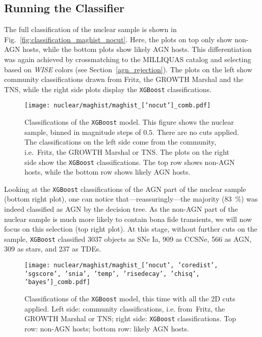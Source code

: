 \subsection{Running the Classifier}\label{classifier_res}
The full classification of the nuclear sample is shown in Fig.~\ref{fig:classification_maghist_nocut}. Here, the plots on top only show non-AGN hosts, while the bottom plots show likely AGN hosts. This differentiation was again achieved by crossmatching to the MILLIQUAS catalog and selecting based on \textit{WISE} colors (see Section~\ref{agn_rejection}). The plots on the left show community classifications drawn from Fritz, the GROWTH Marshal and the TNS, while the right side plots display the \texttt{XGBoost} classifications.

\begin{figure}[H]
  \texttt{[image: nuclear/maghist/maghist\_['nocut']\_comb.pdf]}
  \caption[Classification without cuts]{Classifications of the \texttt{XGBoost} model. This figure shows the nuclear sample, binned in magnitude steps of $0.5$. There are no cuts applied. The classifications on the left side come from the community, i.e.~Fritz, the GROWTH Marshal or TNS. The plots on the right side show the \texttt{XGBoost} classifications. The top row shows non-AGN hosts, while the bottom row shows likely AGN hosts.}
\end{figure}

Looking at the \texttt{XGBoost} classifications of the AGN part of the nuclear sample (bottom right plot), one can notice that---reassuringly---the majority (\SI{83}{\percent}) was indeed classified as AGN by the decision tree. As the non-AGN part of the nuclear sample is much more likely to contain bona fide transients, we will now focus on this selection (top right plot). At this stage, without further cuts on the sample, \texttt{XGBoost} classified 3037 objects as SNe Ia, 909 as CCSNe, 566 as AGN, 309 as stars, and 237 as TDEs.

\begin{figure}[htpb]
  \texttt{[image: nuclear/maghist/maghist\_['nocut', 'coredist', 'sgscore', 'snia', 'temp', 'risedecay', 'chisq', 'bayes']\_comb.pdf]}
  \caption[Classification with all 2D cuts]{Classifications of the \texttt{XGBoost} model, this time with all the 2D cuts applied. Left side: community classifications, i.e. from~Fritz, the GROWTH Marshal or TNS; right side: \texttt{XGBoost} classifications. Top row: non-AGN hosts; bottom row: likely AGN hosts.}
\end{figure}

